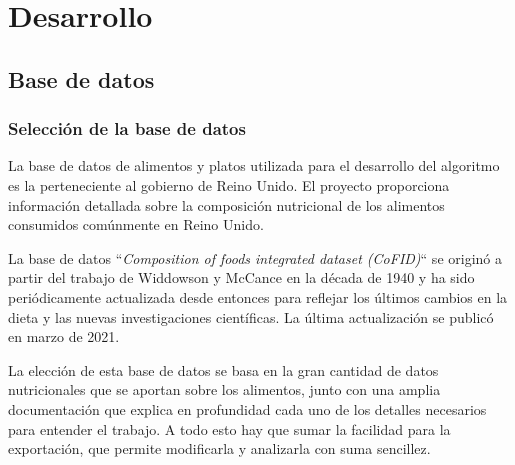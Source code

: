 \chapter{Desarrollo}
\label{ch:desarrollo}


\section{Base de datos}

\subsection{Selección de la base de datos}
La base de datos de alimentos y platos utilizada para el desarrollo del algoritmo es la perteneciente al gobierno de Reino Unido. El proyecto proporciona información detallada sobre la composición nutricional de los alimentos consumidos comúnmente en Reino Unido.~\cite{cofid2021}

La base de datos ``\textit{Composition of foods integrated dataset (CoFID)}`` se originó a partir del trabajo de Widdowson y McCance en la década de 1940 y ha sido periódicamente actualizada desde entonces para reflejar los últimos cambios en la dieta y las nuevas investigaciones científicas. La última actualización se publicó en marzo de 2021.

La elección de esta base de datos se basa en la gran cantidad de datos nutricionales que se aportan sobre los alimentos, junto con una amplia documentación que explica en profundidad cada uno de los detalles necesarios para entender el trabajo. A todo esto hay que sumar la facilidad para la exportación, que permite modificarla y analizarla con suma sencillez.

